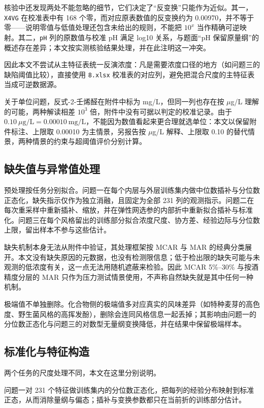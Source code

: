 \documentclass[UTF8,a4paper,zihao=-4]{ctexart}
\numberwithin{figure}{section}
\numberwithin{table}{section}
\numberwithin{equation}{section}
\newcommand{\file}[1]{\texttt{#1}}
\begin{document}
核验中还发现两处不能忽略的细节，它们决定了“反变换”只能作为近似。其一，\file{X4VG} 在校准表中有 168 个零，而对应原表数值的反变换约为 0.00970，并不等于零——说明零值与低值处理还包含未给出的规则，不能把 $10^{x}$ 当作精确可逆映射。其二，\file{pH} 列的原数值与校准 pH 满足 log10 关系，与题面“pH 保留原量纲”的概述存在差异；本文按实测核验结果处理，并在此注明这一冲突。

因此本文不尝试从主特征表统一反演浓度：凡是需要浓度口径的地方（如问题三的缺陷阈值比较），直接使用 \file{8.xlsx} 校准表的对应列，避免把混合尺度的主特征表当成可逆数据源。

关于单位问题，反式-2-壬烯醛在附件中标为 mg/L，但同一列也存在按 $\mu$g/L 理解的可能，两种解读相差 $10^{3}$ 倍，附件中没有可据以判定的校准记录。由于 $0.10\ \mu\mathrm{g/L}=0.00010\ \mathrm{mg/L}$，不能因为数值看起来更合理就选单位：本文以保留附件标注、上限取 0.00010 为主情景，另报告按 $\mu$g/L 解释、上限取 0.10 的替代情景，两种情景的约束与超阈值评价分别计算。

\subsection{缺失值与异常值处理}

预处理按任务分别拟合。问题一在每个内层与外层训练集内做中位数插补与分位数正态化，缺失指示仅作为独立消融，且固定为全部 231 列的观测指示。问题二在每次重采样中重新插补、缩放，并在弹性网选参的内部折中重新拟合插补与标准化。问题三在每个风格留出的训练部分拟合浓度尺度、协方差、经验边际与分位数上限，留出样本不参与这些估计。

缺失机制本身无法从附件中验证，其处理框架按 MCAR 与 MAR 的经典分类展开。本文没有缺失原因的元数据，也没有检测限信息；低于检出限的缺失可能与未观测的低浓度有关，这一点无法用随机遮蔽来检验。因此 MCAR 5\%--30\% 与按酒精度分层的 MAR 只作为压力测试情景使用，不声称自然缺失就是其中任何一种机制。

极端值不单独删除。化合物侧的极端值多对应真实的风味差异（如特种麦芽的高色度、野生菌风格的高挥发酚），删除会连同风格信息一起丢掉；其影响由问题一的分位数正态化与问题三的对数型无量纲变换降低，并在结果中保留极端样本。

\subsection{标准化与特征构造}

两个任务的尺度处理不同，本文在这里分别说明。

问题一对 231 个特征做训练集内的分位数正态化，把每列的经验分布映射到标准正态，从而消除量纲与偏态；插补与变换参数都只在当前折的训练部分估计。
\end{document}
